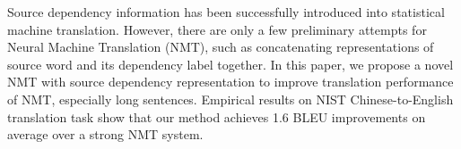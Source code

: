 Source dependency information has been successfully introduced into statistical machine translation. However, there are only a few preliminary attempts for Neural Machine Translation (NMT), such as concatenating representations of source word and its dependency label together. In this paper, we propose a novel NMT with source dependency representation to improve translation performance of NMT, especially long sentences. Empirical results on NIST Chinese-to-English translation task show that our method achieves 1.6 BLEU improvements on average over a strong NMT system.
